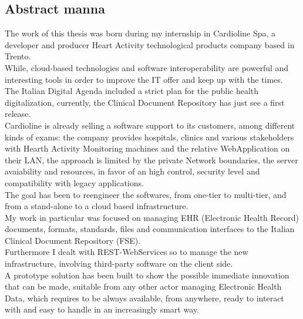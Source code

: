\begin{center}
    {\chapter*{Abstract manna}} %
\end{center}
\label{abstract}

The work of this thesis was born during my internship in Cardioline Spa, a developer and producer Heart Activity technological products company based in Trento.\\While, cloud-based technologies and software interoperability are powerful and interesting tools in order to improve the IT offer and keep up with the times.\\The Italian Digital Agenda included a strict plan for the public health digitalization, currently, the Clinical Document Repository has just see a first release.\\Cardioline is already selling a software support to its customers, among different kinds of exams: the company provides hospitals, clinics and various stakeholders with Hearth Activity Monitoring machines and the relative WebApplication on their LAN, the approach is limited by the private Network boundaries, the server avaiability and resources, in favor of an high control, security level and compatibility with legacy applications.\\The goal has been to reengineer the softwares, from one-tier to multi-tier, and from a stand-alone to a cloud based infrastructure.\\My work in particular was focused on managing EHR (Electronic Health Record) documents, formats, standards, files and communication interfaces to the Italian Clinical Document Repository (FSE).\\Furthermore I dealt with REST-WebServices so to manage the new infrastructure, involving third-party software on the client side.\\A prototype solution has been built to show the possible immediate innovation that can be made, suitable from any other actor managing Electronic Health Data, which requires to be always available, from anywhere, ready to interact with and easy to handle in an increasingly smart way.